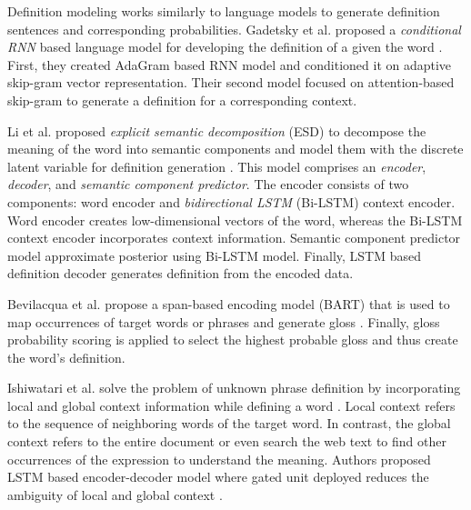 Definition modeling works similarly to language models to generate definition
sentences and corresponding probabilities. Gadetsky et al. proposed a
\textit{conditional RNN} based language model for developing the definition of a
given the word \cite{gadetsky_conditional_2018}. First, they created AdaGram
based RNN model and conditioned it on adaptive skip-gram vector representation.
Their second model focused on attention-based skip-gram to generate a definition
for a corresponding context.

Li et al. proposed \textit{explicit semantic decomposition} (ESD) to decompose
the meaning of the word into semantic components and model them with the
discrete latent variable for definition generation \cite{li_explicit_2020}. This
model comprises an \textit{encoder}, \textit{decoder}, and \textit{semantic
    component predictor}. The encoder consists of two components: word encoder and
\textit{bidirectional LSTM} (Bi-LSTM) context encoder. Word encoder creates
low-dimensional vectors of the word, whereas the Bi-LSTM context encoder
incorporates context information. Semantic component predictor model approximate
posterior using Bi-LSTM model. Finally, LSTM based definition decoder generates
definition from the encoded data.

Bevilacqua et al. propose a span-based encoding model (BART) that is used to map
occurrences of target words or phrases and generate gloss
\cite{bevilacqua_generationary_2020}. Finally, gloss probability scoring is
applied to select the highest probable gloss and thus create the word's
definition.


Ishiwatari et al. solve the problem of unknown phrase definition by
incorporating local and global context information while defining a word
\cite{ishiwatari_learning_2019}. Local context refers to the sequence of
neighboring words of the target word. In contrast, the global context refers to
the entire document or even search the web text to find other occurrences of the
expression to understand the meaning. Authors proposed LSTM based
encoder-decoder model where gated unit deployed reduces the ambiguity of local
and global context \cite{ishiwatari_learning_2019}.

